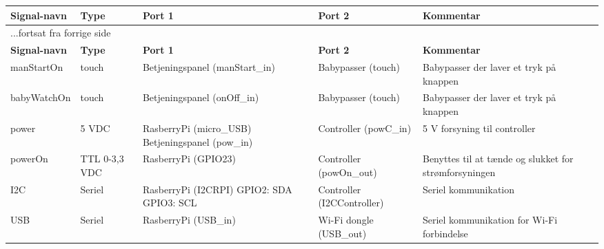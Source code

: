 \begin{center}
\label{ctrl:signaltabel}
\begin{longtable}{|p{}|p{}|p{}|p{}|p{3cm}|}
\hline
\textbf{Signal-navn}	&\textbf{Type} 		&\textbf{Port 1} 	&\textbf{Port 2} 			&\textbf{Kommentar} \\ \hline
\endfirsthead
\multicolumn{5}{l}{...fortsat fra forrige side} \\ \hline 
\textbf{Signal-navn}	&\textbf{Type} 		&\textbf{Port 1} 	&\textbf{Port 2} 			&\textbf{Kommentar} \\ \hline
\endhead


manStartOn
&touch
&Betjeningspanel \newline (manStart\_in)
&Babypasser \newline (touch)
&Babypasser der laver et tryk på knappen
\\\hline

babyWatchOn
&touch
&Betjeningspanel \newline (onOff\_in)
&Babypasser \newline (touch)
&Babypasser der laver et tryk på knappen
\\\hline

power
&5 VDC
&RasberryPi \newline(micro\_USB) \newline
	Betjeningspanel \newline (pow\_in)
&Controller \newline(powC\_in)
&5 V forsyning til controller
\\\hline

powerOn			
&TTL 0-3,3 VDC	
&RasberryPi \newline (GPIO23)				
&Controller \newline (powOn\_out) 			
&Benyttes til at tænde og slukket for strømforsyningen   				\\\hline

I2C			
&Seriel		
&RasberryPi \newline (I2CRPI) \newline	
	GPIO2: SDA \newline	
	GPIO3: SCL \newline	
&Controller \newline (I2CController) 			
&Seriel kommunikation
\\\hline

USB		
&Seriel				
&RasberryPi \newline (USB\_in) 			
&Wi-Fi dongle \newline (USB\_out) \newline	
&Seriel kommunikation for Wi-Fi forbindelse
\\\hline


\end{longtable}
\end{center}
